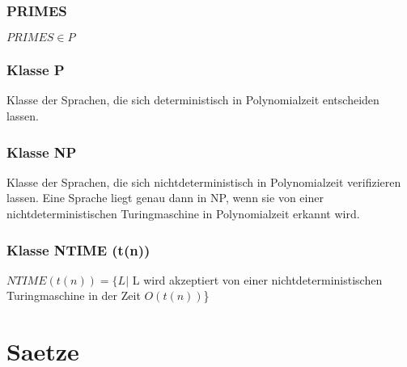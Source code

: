 \documentclass[a4paper]{scrreprt}
\begin{document}
\subsubsection{PRIMES} \textbf{$PRIMES \in P$}
\subsubsection{Klasse P} Klasse der Sprachen, die sich deterministisch in Polynomialzeit entscheiden lassen.
\subsubsection{Klasse NP} Klasse der Sprachen, die sich nichtdeterministisch in Polynomialzeit verifizieren lassen. Eine Sprache liegt genau dann in NP, wenn sie von einer nichtdeterministischen Turingmaschine in Polynomialzeit erkannt wird.
\subsubsection{Klasse NTIME (t(n))} $NTIME (t(n)) = \{L|$ L wird akzeptiert von einer nichtdeterministischen Turingmaschine in der Zeit $O(t(n))$\}



\section{Saetze}
\end{document}
